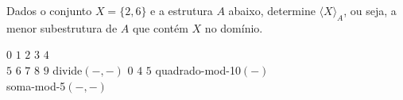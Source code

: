 \begin{exercises}
    \begin{question}
        Dados o conjunto $X = \{2, 6\}$ e a estrutura $A$ abaixo, determine $\langle X \rangle_A$, ou seja, a menor subestrutura de $A$ que contém $X$ no domínio.
        \begin{center}
            \begin{structure}
                {}
                {$0$ $1$ $2$ $3$ $4$\\$5$ $6$ $7$ $8$ $9$}
                {divide$(-,-)$}
                {$0$ $4$ $5$}
                {quadrado-mod-10$(-)$\\soma-mod-5$(-,-)$}
            \end{structure}
        \end{center}
    \end{question}
\end{exercises}